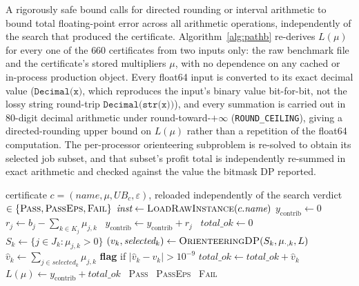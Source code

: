 \documentclass[11pt]{article}
\begin{document}
A rigorously safe bound calls for directed rounding or interval arithmetic to
bound total floating-point error
across all arithmetic operations, independently of the search that produced the
certificate. Algorithm~\ref{alg:pathb} re-derives $L(\mu)$ for every one of the
$660$ certificates from two inputs only: the raw benchmark file and the
certificate's stored multipliers $\mu$, with no dependence on any cached or
in-process production object. Every float64 input is converted to its exact
decimal value ($\texttt{Decimal(x)}$, which reproduces the input's binary value
bit-for-bit, not the lossy string round-trip $\texttt{Decimal(str(x))}$), and
every summation is carried out in $80$-digit decimal arithmetic under
round-toward-$+\infty$ (\texttt{ROUND\_CEILING}), giving a directed-rounding
upper bound on $L(\mu)$ rather than a repetition of the float64 computation. The
per-processor orienteering subproblem is re-solved to obtain its selected job
subset, and that subset's profit total is independently re-summed in exact
arithmetic and checked against the value the bitmask DP reported.

\begin{algorithm}[t]
\caption{Independent certificate re-derivation (Path~B)}
\label{alg:pathb}
\begin{algorithmic}[1]
\Require certificate $c=(\textit{name},\mu,UB_c,\varepsilon)$, reloaded independently of the search
\Ensure verdict $\in\{\textsc{Pass},\textsc{PassEps},\textsc{Fail}\}$
\State $\textit{inst}\gets\textsc{LoadRawInstance}(c.\textit{name})$ 
\State $y_{\text{contrib}}\gets 0$ 
    \State $r_j\gets b_j-\sum_{k\in K_j}\mu_{j,k}$
    \ $y_{\text{contrib}}\gets y_{\text{contrib}}+r_j$\ \EndIf
\EndFor
\State $\textit{total\_ok}\gets 0$
    \State $S_k\gets\{j\in J_k:\mu_{j,k}>0\}$
    \State $(v_k,\textit{selected}_k)\gets\textsc{OrienteeringDP}(S_k,\mu_{\cdot,k},L)$ 
    \State $\hat v_k\gets\sum_{j\in\textit{selected}_k}\mu_{j,k}$ 
    \State \textbf{flag} if $|\hat v_k-v_k|>10^{-9}$ 
    \State $\textit{total\_ok}\gets\textit{total\_ok}+\hat v_k$
\EndFor
\State $L(\mu)\gets y_{\text{contrib}}+\textit{total\_ok}$
\ \Return \textsc{Pass}
\ \Return \textsc{PassEps}
\Else\ \Return \textsc{Fail}
\EndIf
\end{algorithmic}
\end{algorithm}
\end{document}
